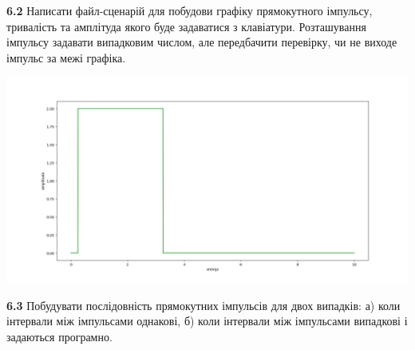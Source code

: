 \documentclass[a4paper,12pt]{article}
\begin{document}
\textbf{6.2} Написати файл-сценарій для побудови графіку прямокутного імпульсу, тривалість та амплітуда якого буде задаватися з клавіатури. Розташування імпульсу задавати випадковим числом, але передбачити перевірку, чи не виходе імпульс за межі графіка.



\begin{center}
\includegraphics[height = 12 cm,width=15 cm]{6.2.png}
\end{center}

\textbf{6.3} Побудувати послідовність прямокутних імпульсів для двох випадків: а) коли інтервали між імпульсами однакові, б) коли інтервали між імпульсами випадкові і задаються програмно.

\end{document}

